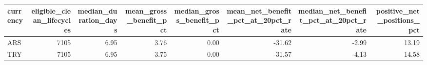\begin{tabular}{lrrrrrrr}
\toprule
currency & eligible\_clean\_lifecycles & median\_duration\_days & mean\_gross\_benefit\_pct & median\_gross\_benefit\_pct & mean\_net\_benefit\_pct\_at\_20pct\_rate & median\_net\_benefit\_pct\_at\_20pct\_rate & positive\_net\_positions\_pct \\
\midrule
ARS & 7105 & 6.95 & 3.76 & 0.00 & -31.62 & -2.99 & 13.19 \\
TRY & 7105 & 6.95 & 3.75 & 0.00 & -31.57 & -4.13 & 14.58 \\
\bottomrule
\end{tabular}
